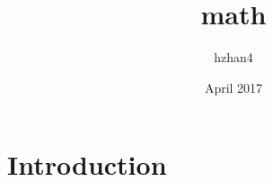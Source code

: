 \documentclass{article}
\title{math}
\author{hzhan4 }
\date{April 2017}
\begin{document}
\maketitle

\section{Introduction}
\end{document}
